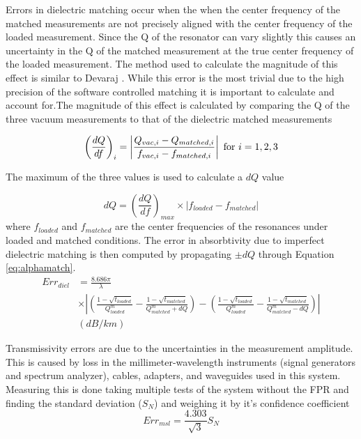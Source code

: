 Errors in dielectric matching occur when the when the center frequency of the matched measurements are not precisely aligned with the center frequency of the loaded measurement. Since the Q of the resonator can vary slightly this causes an uncertainty in the Q of the matched measurement at the true center frequency of the loaded measurement. The method used to calculate the magnitude of this effect is similar to Devaraj \cite{Devaraj-thesis}. While this error is the most trivial due to the high precision of the software controlled matching it is important to calculate and account for.The magnitude of this effect is calculated by comparing the Q of the three vacuum measurements to that of the dielectric matched measurements

\begin{equation}
\left(\frac{dQ}{df} \right)_i = \left|\frac{Q_{vac,i} - Q_{matched,i}}{f_{vac,i} - f_{matched,i}} \right| \textnormal{ for } i = 1,2,3
\end{equation}

The maximum of the three values is used to calculate a $dQ$ value

\begin{equation}
dQ = \left(\frac{dQ}{df} \right)_{max} \times |f_{loaded} - f_{matched}|
\end{equation}
where $f_{loaded}$ and $ f_{matched}$ are the center frequencies of the resonances under loaded and matched conditions. The error in absorbtivity due to imperfect dielectric matching is then computed by propagating $\pm dQ$ through Equation \ref{eq:alphamatch}.
\begin{equation}
\begin{split}
Err_{diel} &= \frac{8.686 \pi}{\lambda} 
\\ &\times \left| \left( \frac{1-\sqrt{t_{loaded}}}{Q^m_{loaded}} - \frac{1-\sqrt{t_{matched}}}{Q^m_{matched} + dQ} \right) - \left( \frac{1-\sqrt{t_{loaded}}}{Q^m_{loaded}} - \frac{1-\sqrt{t_{matched}}}{Q^m_{matched} - dQ} \right) \right|\\
 &(dB/km)
\end{split}
\end{equation}

Transmissivity errors are due to the uncertainties in the measurement amplitude. This is caused by loss in the millimeter-wavelength instruments (signal generators and spectrum analyzer), cables, adapters, and waveguides used in this system. Measuring this is done taking multiple tests of the system without the FPR and finding the standard deviation ($S_N$) and weighing it by it's confidence coefficient
\begin{equation}
Err_{msl} = \frac{4.303}{\sqrt{3}}S_N
\end{equation}

